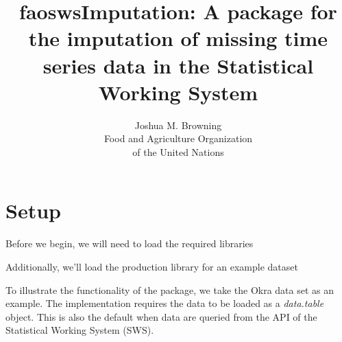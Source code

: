 \documentclass[nojss]{jss}
\title{\bf faoswsImputation: A package for the imputation of missing time
series data in the Statistical Working System}
\author{Joshua M. Browning\\ Food and Agriculture
    Organization \\ of the United Nations\\}
\begin{document}
\section{Setup}

Before we begin, we will need to load the required libraries

\begin{knitrout}
\color{fgcolor}\begin{kframe}
\begin{alltt}
\end{alltt}
\end{kframe}
\end{knitrout}

Additionally, we'll load the production library for an example dataset

\begin{knitrout}
\color{fgcolor}\begin{kframe}
\begin{alltt}
\end{alltt}
\end{kframe}
\end{knitrout}

To illustrate the functionality of the package, we take the Okra data
set as an example. The implementation requires the data to be loaded as
a \textit{data.table} object. This is also the default when data are
queried from the API of the Statistical Working System (SWS).
\end{document}
